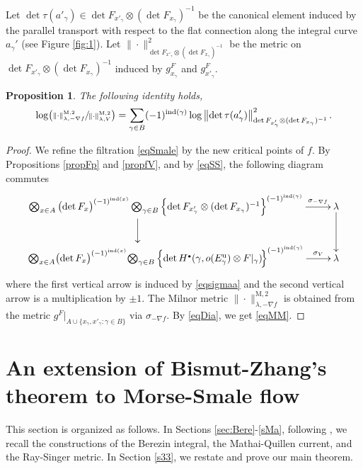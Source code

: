 \documentclass[11pt]{article}
\numberwithin{equation}{section}
\newcommand{\sbullet}{{\scriptscriptstyle\bullet}}
\newcommand{\ru}{\mathrm{u}}
\newcommand{\rM}{\mathrm{M}}
\theoremstyle{plain}
\newtheorem{prop}[lem]{Proposition}
\theoremstyle{definition}
\theoremstyle{remark}
\DeclareMathOperator{\ind}{ind}
\begin{document}
Let $\det \tau({a'_{\gamma}})\in \det
F_{x'_{\gamma}}\otimes (\det
F_{x_{\gamma}})^{-1}$ be the canonical element induced by the
parallel transport with respect to the flat connection along the
integral curve $a_{\gamma}'$ (see Figure \ref{fig:1}). Let $\|{\cdot}\|^{2}_{\det
F_{x'_{\gamma}}\otimes (\det
F_{x_{\gamma}})^{-1}}$ be the metric on $\det
F_{x'_{\gamma}}\otimes (\det
F_{x_{\gamma}})^{-1}$ induced by $g^{F}_{x_{\gamma}}$ and
$g^{F}_{x'_{\gamma}}$. 

\begin{prop}\label{propMM}
The following identity holds,
\begin{equation}\label{eqMM}
\log\bigl(\sfrac{\|{\cdot}\|^{\rM,2}_{\lambda,-\nabla
f}}{\|{\cdot}\|^{\rM,2}_{\lambda,V}}\bigr)=\sum_{\gamma\in
B}(-1)^{\ind(\gamma)}\log
\left\|{\det\,}\tau(a_{\gamma}')\right\|^{2}_{\det
F_{x'_{\gamma}}\otimes (\det
F_{x_{\gamma}})^{-1}}.
\end{equation}
\end{prop}
\begin{proof}
We refine the filtration \eqref{eqSmale} by the new critical
points of $f$. By Propositions \ref{propFp} and \ref{propfV}, and by
\eqref{eqSS}, the following diagram commutes
\begin{equation}\label{eqDia}
\begin{aligned}
\xymatrix{
\bigotimes_{x\in A} \big(\!\det F_{x}\big)^{ (-1)^{\ind (x)}}
\bigotimes_{\gamma\in B} \left\{\det
F_{x'_{\gamma}}\otimes (\det
F_{x_{\gamma}})^{-1}\right\}^{(-1)^{\ind (\gamma)}}
\ar@<-1cm>[d]
\ar[r]^-{\sigma_{-\nabla f}} &\lambda\ar[d]
\\
\bigotimes_{x\in A}\!\big(\!\det
F_{x}\big)^{(-1)^{\ind (x)}} \!
\bigotimes_{\gamma \in B}\Big\{\!\det
H^{\sbullet}(\gamma,o(E^{\ru}_{\gamma})\otimes
F|_{\gamma})\!\Big\}^{(-1)^{\ind
(\gamma)}}\ar[r]^-{\sigma_V} &\lambda}
\end{aligned}
\end{equation}
where the first vertical arrow is induced by \eqref{eqsigmaa} and
the second vertical arrow is a multiplication by $\pm 1$. The Milnor metric $\|{\cdot}\|_{\lambda,-\nabla f}^{\rM,2}$ is
obtained from the metric $g^{F}|_{A \cup
\{x_{\gamma},x'_{\gamma}:\gamma\in B\}}$ via $\sigma_{-\nabla f}$.
By \eqref{eqDia}, we get
\eqref{eqMM}.
\end{proof}

\section{An extension of Bismut-Zhang's theorem to Morse-Smale
flow}\label{S2}
This section is organized as follows. In Sections
\ref{sec:Bere}-\ref{sMa}, following \cite{BZ92}, we recall the
constructions of the Berezin integral, the Mathai-Quillen current, and the Ray-Singer metric.
In Section \ref{s33}, we restate and prove our main theorem.
\end{document}
